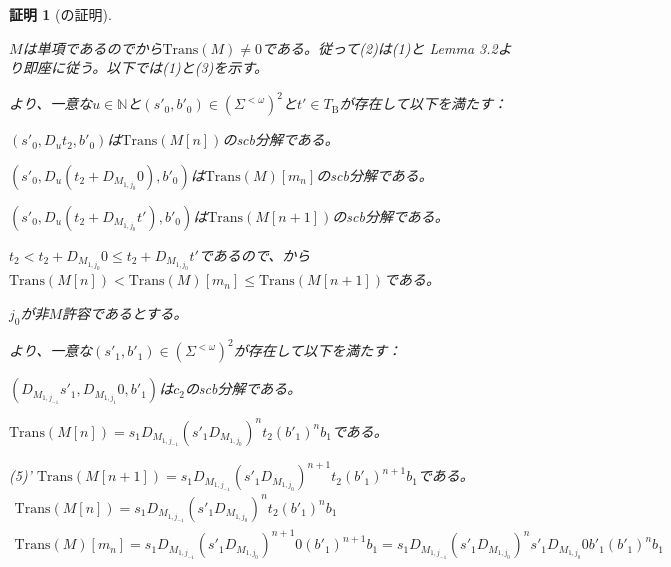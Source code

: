 \documentclass[dvipdfmx,uplatex]{jsarticle}
\theoremstyle{customnonumberbreakfortheorem}
\theoremstyle{customnonumberbreakforproof}
\newtheorem{hideableproof}{証明}
\newcommand{\qedhere}{\hfill\hideableproofSymbol}
\begin{document}
\begin{hideableproof}[の証明]
	\begin{penumerate}
		\item[] \(M\)は単項であるのでから\(\textrm{Trans}(M) \neq 0\)である。従って(2)は(1)と\cite{buc1} Lemma 3.2より即座に従う。以下では(1)と(3)を示す。
		\item[] より、一意な\(u \in \mathbb{N}\)と\((s'_0,b'_0) \in (\Sigma^{< \omega})^2\)と\(t' \in T_{\textrm{B}}\)が存在して以下を満たす：
		\item \((s'_0,D_u t_2,b'_0)\)は\(\textrm{Trans}(M[n])\)のscb分解である。
		\item \((s'_0,D_u(t_2 + D_{M_{1,j_0}} 0),b'_0)\)は\(\textrm{Trans}(M)[m_n]\)のscb分解である。
		\item \((s'_0,D_u(t_2 + D_{M_{1,j_0}} t'),b'_0)\)は\(\textrm{Trans}(M[n+1])\)のscb分解である。
		\item[] \(t_2 < t_2 + D_{M_{1,j_0}} 0 \leq t_2 + D_{M_{1,j_0}} t'\)であるので、から\(\textrm{Trans}(M[n]) < \textrm{Trans}(M)[m_n] \leq \textrm{Trans}(M[n+1])\)である。\qedhere
		\item[]
		\item[] \(j_0\)が非\(M\)許容であるとする。
		\begin{indented}
			\item {}より、一意な\((s'_1,b'_1) \in (\Sigma^{< \omega})^2\)が存在して以下を満たす：
			\begin{penumerate}
				\item \((D_{M_{1,j_{-1}}} s'_1,D_{M_{1,j_1}} 0,b'_1)\)は\(c_2\)のscb分解である。
				\setcounter{penumerateii}{4}
				\item \(\textrm{Trans}(M[n]) = s_1 D_{M_{1,j_{-1}}} (s'_1 D_{M_{1,j_0}})^n t_2 (b'_1)^n b_1\)である。
				\item[] (5)' \(\textrm{Trans}(M[n+1]) = s_1 D_{M_{1,j_{-1}}} (s'_1 D_{M_{1,j_0}})^{n+1} t_2 (b'_1)^{n+1} b_1\)である。
				\begin{eqnarray*}
				\textrm{Trans}(M[n]) = s_1 D_{M_{1,j_{-1}}} (s'_1 D_{M_{1,j_0}})^n t_2 (b'_1)^n b_1 \\
				\textrm{Trans}(M)[m_n] = s_1 D_{M_{1,j_{-1}}} (s'_1 D_{M_{1,j_0}})^{n+1} 0 (b'_1)^{n+1} b_1 = s_1 D_{M_{1,j_{-1}}} (s'_1 D_{M_{1,j_0}})^n s'_1 D_{M_{1,j_0}} 0 b'_1 (b'_1)^n b_1
				\end{eqnarray*}
			\end{penumerate}

\end{indented}
\end{penumerate}
\end{hideableproof}
\end{document}
